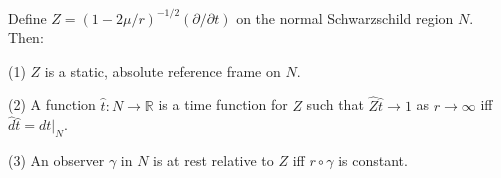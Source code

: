 Define $Z = (1 - 2\mu/r)^{-1/2}(\partial/\partial t)$ on the normal Schwarzschild region $N$. Then:

(1) $Z$ is a static, absolute reference frame on $N$.

(2) A function $\hat{t}: N \to \mathbb{R}$ is a time function for $Z$ such that $\hat{Z}\hat{t} \to 1$ as $r \to \infty$ iff $\hat{d}\hat{t} = dt|_N$.

(3) An observer $\gamma$ in $N$ is at rest relative to $Z$ iff $r \circ \gamma$ is constant.
